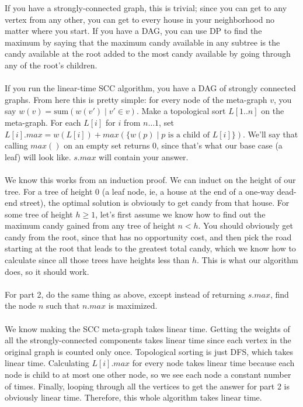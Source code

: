 \documentclass[11pt]{article}
\begin{document}
\begin{solution}
    If you have a strongly-connected graph, this is trivial; since you can get to any vertex from any other, you can get to every house in your neighborhood no matter where you start. If you have a DAG, you can use DP to find the maximum by saying that the maximum candy available in any subtree is the candy available at the root added to the most candy available by going through any of the root's children. 
    \\ \\ If you run the linear-time SCC algorithm, you have a DAG of strongly connected graphs. From here this is pretty simple: for every node of the meta-graph $v$, you say $w(v) = \text{sum}(w(v') \mid v' \in v)$. Make a topological sort $L[1..n]$ on the meta-graph. For each $L[i]$ for $i$ from $n\ldots 1$, set $L[i].max = w(L[i]) + max(\{w(p) \mid \text{$p$ is a child of $L[i]$}\})$. We'll say that calling $max()$ on an empty set returns 0, since that's what our base case (a leaf) will look like. $s.max$ will contain your answer.
    \\ \\ We know this works from an induction proof. We can induct on the height of our tree. For a tree of height 0 (a leaf node, ie, a house at the end of a one-way dead-end street), the optimal solution is obviously to get candy from that house. For some tree of height $h \geq 1$, let's first assume we know how to find out the maximum candy gained from any tree of height $n < h$. You should obviously get candy from the root, since that has no opportunity cost, and then pick the road starting at the root that leads to the greatest total candy, which we know how to calculate since all those trees have heights less than $h$. This is what our algorithm does, so it should work.
    \\ \\ For part 2, do the same thing as above, except instead of returning $s.max$, find the node $n$ such that $n.max$ is maximized.
    \\ \\ We know making the SCC meta-graph takes linear time. Getting the weights of all the strongly-connected components takes linear time since each vertex in the original graph is counted only once. Topological sorting is just DFS, which takes linear time. Calculating $L[i].max$ for every node takes linear time because each node is child to at most one other node, so we see each node a constant number of times. Finally, looping through all the vertices to get the answer for part 2 is obviously linear time. Therefore, this whole algorithm takes linear time.
\end{solution}
\end{document}
